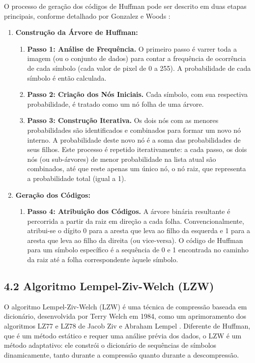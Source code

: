 \documentclass{report}
\begin{document}
O processo de geração dos códigos de Huffman pode ser descrito em duas etapas principais, conforme detalhado por Gonzalez e Woods \cite{Gonzalez2010}:

\begin{enumerate}
    \item \textbf{Construção da Árvore de Huffman:}
    \begin{enumerate}
        \item \textbf{Passo 1: Análise de Frequência.} O primeiro passo é varrer toda a imagem (ou o conjunto de dados) para contar a frequência de ocorrência de cada símbolo (cada valor de pixel de 0 a 255). A probabilidade de cada símbolo é então calculada.
        \item \textbf{Passo 2: Criação dos Nós Iniciais.} Cada símbolo, com sua respectiva probabilidade, é tratado como um nó folha de uma árvore.
        \item \textbf{Passo 3: Construção Iterativa.} Os dois nós com as menores probabilidades são identificados e combinados para formar um novo nó interno. A probabilidade deste novo nó é a soma das probabilidades de seus filhos. Este processo é repetido iterativamente: a cada passo, os dois nós (ou sub-árvores) de menor probabilidade na lista atual são combinados, até que reste apenas um único nó, o nó raiz, que representa a probabilidade total (igual a 1).
    \end{enumerate}
    
    \item \textbf{Geração dos Códigos:}
    \begin{enumerate}
        \item \textbf{Passo 4: Atribuição dos Códigos.} A árvore binária resultante é percorrida a partir da raiz em direção a cada folha. Convencionalmente, atribui-se o dígito 0 para a aresta que leva ao filho da esquerda e 1 para a aresta que leva ao filho da direita (ou vice-versa). O código de Huffman para um símbolo específico é a sequência de 0 e 1 encontrada no caminho da raiz até a folha correspondente àquele símbolo.
    \end{enumerate}
\end{enumerate}

\subsection*{4.2 Algoritmo Lempel-Ziv-Welch (LZW)}


O algoritmo Lempel-Ziv-Welch (LZW) é uma técnica de compressão baseada em dicionário, desenvolvida por Terry Welch em 1984, como um aprimoramento dos algoritmos LZ77 e LZ78 de Jacob Ziv e Abraham Lempel \cite{Welch1984}. Diferente de Huffman, que é um método estático e requer uma análise prévia dos dados, o LZW é um método adaptativo: ele constrói o dicionário de sequências de símbolos dinamicamente, tanto durante a compressão quanto durante a descompressão.
\end{document}
